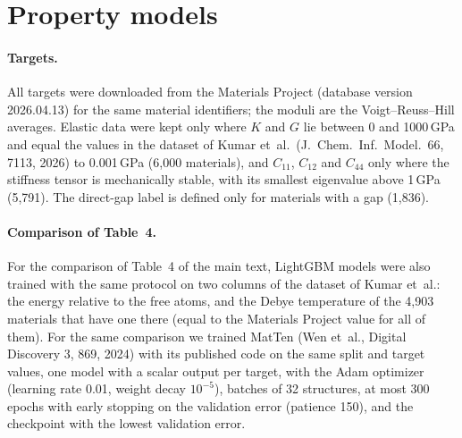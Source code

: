 \documentclass[journal=jctcce,manuscript=suppinfo,email=true]{achemso}
\begin{document}
\section{Property models}
\label{si:props}

\paragraph{Targets.} All targets were downloaded from the Materials Project
(database version 2026.04.13) for the same material identifiers; the moduli are
the Voigt--Reuss--Hill averages. Elastic data were kept only where $K$ and
$G$ lie between 0 and 1000\,GPa and equal the values in the dataset of Kumar
et~al.\ (J.\ Chem.\ Inf.\ Model.\ 66, 7113, 2026) to 0.001\,GPa (6,000
materials), and $C_{11}$, $C_{12}$ and $C_{44}$ only where the stiffness tensor
is mechanically stable, with its smallest eigenvalue above 1\,GPa (5,791). The
direct-gap label is defined only for materials with a gap (1,836).

\paragraph{Comparison of Table~4.} For the comparison of Table~4 of the main text, LightGBM models
were also trained with the same protocol on two columns of the dataset of
Kumar et~al.: the
energy relative to the free atoms, and the Debye temperature of the 4,903
materials that have one there (equal to the Materials Project value for all of
them). For the same comparison we trained MatTen (Wen et~al., Digital
Discovery 3, 869, 2024) with its published code on the same split and target
values, one model with a scalar output per target, with the Adam optimizer
(learning rate 0.01, weight decay $10^{-5}$), batches of 32 structures, at most
300 epochs with early stopping on the validation error (patience 150), and the
checkpoint with the lowest validation error.
\end{document}
